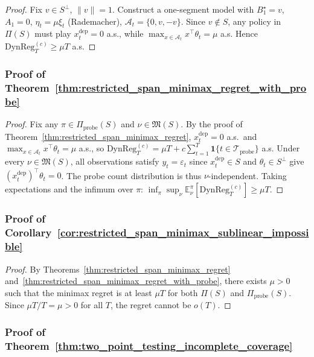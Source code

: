 \documentclass{article}
\newcommand{\E}{\mathbb{E}}
\newcommand{\cA}{\mathcal{A}}
\newcommand{\cTprobe}{\mathcal{T}_{\mathrm{probe}}}
\newcommand{\DynReg}{\mathrm{DynReg}}
\begin{document}
\begin{proof}
Fix $v \in S^\perp$, $\|v\|=1$.
Construct a one-segment model with $B_1^\star = v$, $A_1 = 0$, $\eta_t = \mu \xi_t$ (Rademacher), $\cA_t = \{0, v, -v\}$.
Since $v \notin S$, any policy in $\Pi(S)$ must play $x_t^{\mathrm{dep}} = 0$ a.s., while $\max_{x \in \cA_t} x^\top \theta_t = \mu$ a.s.
Hence $\DynReg_T^{(c)} \ge \mu T$ a.s.
\end{proof}

\subsubsection{Proof of Theorem~\ref{thm:restricted_span_minimax_regret_with_probe}}
\label{proof:restricted_span_minimax_regret_with_probe}

\begin{proof}
Fix any $\pi \in \Pi_{\mathrm{probe}}(S)$ and $\nu \in \mathfrak M(S)$.
By the proof of Theorem~\ref{thm:restricted_span_minimax_regret}, $x_t^{\mathrm{dep}} = 0$ a.s.\ and $\max_{x\in\cA_t} x^\top \theta_t = \mu$ a.s., so
$\DynReg_T^{(c)} = \mu T + c\sum_{t=1}^T \mathbf{1}\{t\in\cTprobe\}$ a.s.
Under every $\nu \in \mathfrak M(S)$, all observations satisfy $y_t = \varepsilon_t$ since $x_t^{\mathrm{dep}} \in S$ and $\theta_t \in S^\perp$ give $(x_t^{\mathrm{dep}})^\top \theta_t = 0$.
The probe count distribution is thus $\nu$-independent.
Taking expectations and the infimum over $\pi$:
$\inf_{\pi} \sup_{\nu} \E_\nu^\pi[\DynReg_T^{(c)}] \ge \mu T$.
\end{proof}

\subsubsection{Proof of Corollary~\ref{cor:restricted_span_minimax_sublinear_impossible}}
\label{proof:restricted_span_minimax_sublinear_impossible}

\begin{proof}
By Theorems~\ref{thm:restricted_span_minimax_regret} and~\ref{thm:restricted_span_minimax_regret_with_probe}, there exists $\mu > 0$ such that the minimax regret is at least $\mu T$ for both $\Pi(S)$ and $\Pi_{\mathrm{probe}}(S)$.
Since $\mu T / T = \mu > 0$ for all $T$, the regret cannot be $o(T)$.
\end{proof}

\subsubsection{Proof of Theorem~\ref{thm:two_point_testing_incomplete_coverage}}
\label{proof:two_point_testing_incomplete_coverage}
\end{document}
